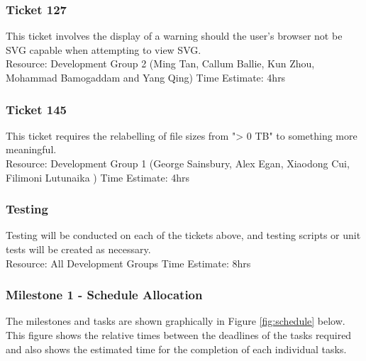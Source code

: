 \documentclass{article}
\begin{document}
\subsubsection{Ticket 127}
	This ticket involves the display of a warning should the user's browser not be SVG capable when attempting to view SVG.\\
	
	Resource: Development Group 2 (Ming Tan, Callum Ballie, Kun Zhou, Mohammad Bamogaddam and Yang Qing)
	Time Estimate: 4hrs

\subsubsection{Ticket 145}
	This ticket requires the relabelling of file sizes from  "> 0 TB" to something more meaningful.\\
	
	Resource: Development Group 1 (George Sainsbury, Alex Egan, Xiaodong Cui, Filimoni Lutunaika )
	Time Estimate: 4hrs
	
\subsubsection{Testing}
	Testing will be conducted on each of the tickets above, and testing scripts or unit tests will be created as necessary.\\
	
	Resource: All Development Groups
	Time Estimate: 8hrs

\subsubsection{Milestone 1 - Schedule Allocation}

The milestones and tasks are shown graphically in Figure \ref{fig:schedule} below. This figure shows the relative times between the deadlines of the tasks required and also shows the estimated time for the completion of each individual tasks.\\
\end{document}
